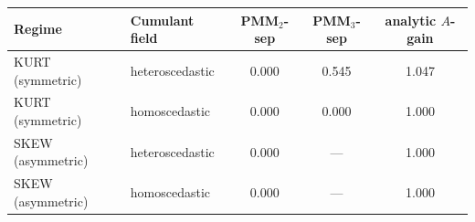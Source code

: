 \begin{tabular}{llccc}
\toprule
Regime & Cumulant field & PMM$_2$-sep & PMM$_3$-sep & analytic $A$-gain \\
\midrule
KURT (symmetric) & heteroscedastic & 0.000 & 0.545 & 1.047 \\
KURT (symmetric) & homoscedastic & 0.000 & 0.000 & 1.000 \\
SKEW (asymmetric) & heteroscedastic & 0.000 & --- & 1.000 \\
SKEW (asymmetric) & homoscedastic & 0.000 & --- & 1.000 \\
\bottomrule
\end{tabular}
